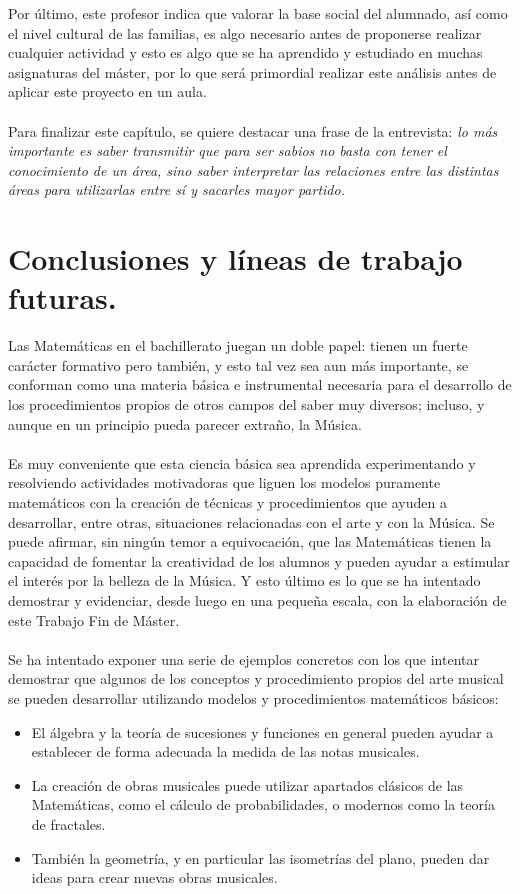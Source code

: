 \documentclass[a4paper, openright, 11pt, titlepage]{report}
\theoremstyle{definition}\newtheorem{defin}[propo]{Definition}
\theoremstyle{definition}\newtheorem{obser}[propo]{Remark}
\theoremstyle{definition}\newtheorem{ejem}[propo]{Ejemplo}
\theoremstyle{definition}\newtheorem{algoritmo}[propo]{Algoritmo}
\begin{document}
Por último, este profesor indica que valorar la base social del alumnado, así como el nivel cultural de las familias, es algo necesario antes de proponerse realizar cualquier actividad y esto es algo que se ha aprendido y estudiado en muchas asignaturas del máster, por lo que será primordial realizar este análisis antes de aplicar este proyecto en un aula.\\\\
Para finalizar este capítulo, se quiere destacar una frase de la entrevista: \textit{lo  más  importante  es  saber  transmitir  que  para  ser  sabios  no  basta  con tener  el  conocimiento  de  un  área,  sino  saber  interpretar  las  relaciones  entre  las  distintas áreas para utilizarlas entre sí y sacarles mayor partido.}


\chapter{Conclusiones y líneas de trabajo futuras.}
Las Matemáticas en el bachillerato juegan un doble papel: tienen un fuerte carácter formativo pero también, y esto tal vez sea aun más importante, se conforman como una materia básica e instrumental necesaria para el desarrollo de los procedimientos propios de otros campos del saber muy diversos; incluso, y aunque en un principio pueda parecer extraño, la Música.\\\\
Es muy conveniente que esta ciencia básica sea aprendida experimentando y resolviendo actividades motivadoras que liguen los modelos puramente matemáticos con la creación de técnicas y procedimientos que ayuden a desarrollar, entre otras, situaciones relacionadas con el arte y con la Música. Se puede afirmar, sin ningún temor a equivocación, que las Matemáticas tienen la capacidad de fomentar la creatividad de los alumnos y pueden ayudar a estimular el interés por la belleza de la Música. Y esto último es lo que se ha intentado demostrar y evidenciar, desde luego en una pequeña escala, con la elaboración de este Trabajo Fin de Máster.\\\\
Se ha intentado exponer una serie de ejemplos concretos con los que intentar demostrar que algunos de los conceptos y procedimiento propios del arte musical se pueden desarrollar utilizando modelos y procedimientos matemáticos básicos:
\begin{itemize}
    \item El álgebra y la teoría de sucesiones y funciones en general pueden ayudar a establecer de forma adecuada la medida de las notas musicales.
    \item La creación de obras musicales puede utilizar apartados clásicos de las Matemáticas, como el cálculo de probabilidades, o modernos como la teoría de fractales.
    \item También la geometría, y en particular las isometrías del plano, pueden dar ideas para crear nuevas obras musicales.
\end{itemize}
\end{document}
